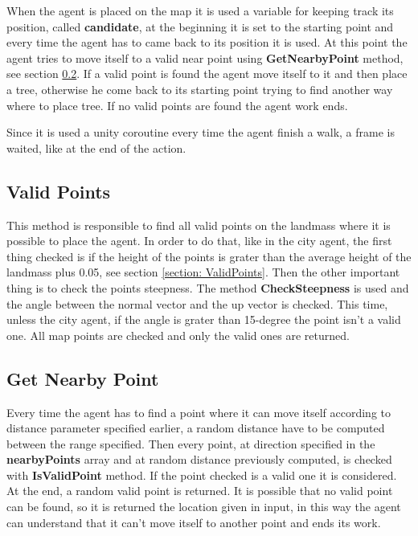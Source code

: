 \documentclass[12pt]{article}
\begin{document}
    When the agent is placed on the map it is used a variable for keeping track its position, called \textbf{candidate}, at the beginning it is set to the starting point and
    every time the agent has to came back to its position it is used. At this point the agent tries to move itself to a valid near point using \textbf{GetNearbyPoint} method, see section \ref{section:nearbyPoint}.
    If a valid point is found the agent move itself to it and then place a tree, otherwise he come back to its starting point trying to find another way where to place tree. If 
    no valid points are found the agent work ends.

    Since it is used a unity coroutine every time the agent finish a walk, a frame is waited, like at the end of the action.

    \subsection{Valid Points} \label{section:validPoints}
    This method is responsible to find all valid points on the landmass where it is possible to place the agent. In order to do that, like in the city agent, the first thing checked 
    is if the height of the points is grater than the average height of the landmass plus 0.05, see section \ref{section: ValidPoints}. Then the other important thing is to check the points
    steepness. The method \textbf{CheckSteepness} is used and the angle between the normal vector and the up vector is checked. This time, unless the city agent, if the angle is grater
    than 15-degree the point isn't a valid one. All map points are checked and only the valid ones are returned.

    \subsection{Get Nearby Point} \label{section:nearbyPoint}
    Every time the agent has to find a point where it can move itself according to distance parameter specified earlier, a random distance have to be computed between the range specified.
    Then every point, at direction specified in the \textbf{nearbyPoints} array and at random distance previously computed, is checked with \textbf{IsValidPoint} method. If the point 
    checked is a valid one it is considered. At the end, a random valid point is returned. It is possible that no valid point can be found, so it is returned the location given in input,
    in this way the agent can understand that it can't move itself to another point and ends its work.
    
\end{document}
